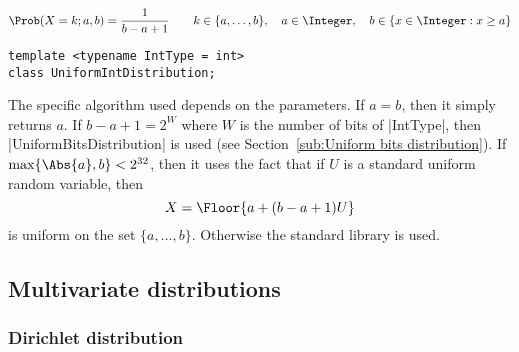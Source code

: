 \begin{equation*}
  \Prob(X = k;a,b) = \frac{1}{b - a + 1} \qquad
  k \in \{a,\dots,b\},\quad
  a \in \Integer,\quad b \in \{x \in \Integer: x \ge a\}
\end{equation*}
\begin{Verbatim}
template <typename IntType = int>
class UniformIntDistribution;
\end{Verbatim}
The specific algorithm used depends on the parameters. If $a = b$, then it
simply returns $a$. If $b - a + 1 = 2^W$ where $W$ is the number of bits of
|IntType|, then |UniformBitsDistribution| is used (see Section~\ref{sub:Uniform
bits distribution}). If $\max\{\Abs{a}, b\} < 2^{32}$, then it uses the fact
that if $U$ is a standard uniform random variable, then
\begin{equation*}
  X = \Floor{a + (b - a + 1) U}
\end{equation*}
is uniform on the set $\{a,\dots,b\}$. Otherwise the standard library is used.

\subsection{Multivariate distributions}
\label{sub:Multivariate distributions}

\subsubsection{Dirichlet distribution}

